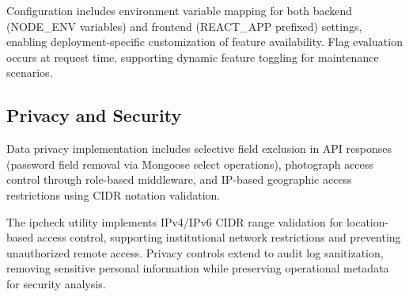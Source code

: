 Configuration includes environment variable mapping for both backend (NODE_ENV variables) and frontend (REACT_APP prefixed) settings, enabling deployment-specific customization of feature availability. Flag evaluation occurs at request time, supporting dynamic feature toggling for maintenance scenarios.

\subsection{Privacy and Security}

Data privacy implementation includes selective field exclusion in API responses (password field removal via Mongoose select operations), photograph access control through role-based middleware, and IP-based geographic access restrictions using CIDR notation validation.

The ipcheck utility implements IPv4/IPv6 CIDR range validation for location-based access control, supporting institutional network restrictions and preventing unauthorized remote access. Privacy controls extend to audit log sanitization, removing sensitive personal information while preserving operational metadata for security analysis.